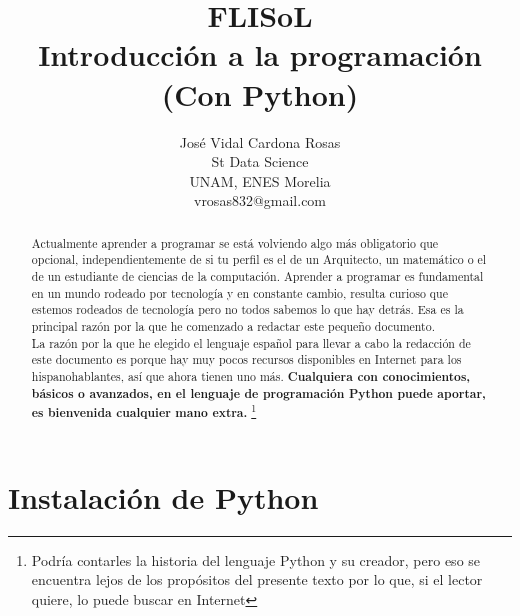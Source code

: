 \documentclass[a4paper,10pt]{article}
\title{FLISoL\\Introducción a la programación\\
(Con Python)}
\author{José Vidal Cardona Rosas\\
St Data Science\\
UNAM, ENES Morelia\\
vrosas832@gmail.com}
\begin{document}
\maketitle

\begin{abstract}
    Actualmente aprender a programar se está volviendo algo más obligatorio 
    que opcional, independientemente de si tu perfil es el de un Arquitecto, 
    un matemático o el de un estudiante de ciencias de la computación. Aprender 
    a programar es fundamental en un mundo rodeado por tecnología y en 
    constante cambio, resulta curioso que estemos rodeados de tecnología pero 
    no todos sabemos lo que hay detrás. Esa es la principal razón por la
    que he comenzado a redactar este pequeño documento.
    \\
    
    La razón por la que he elegido el lenguaje español para llevar a cabo 
    la redacción de este documento es porque hay muy pocos recursos disponibles
    en Internet para los hispanohablantes, así que ahora tienen uno más.
    \textbf{Cualquiera con conocimientos, básicos o avanzados, en el lenguaje 
    de programación Python puede aportar, es bienvenida cualquier mano extra.}
    \footnote{Podría contarles la historia del lenguaje Python
    y su creador, pero eso se encuentra lejos de los propósitos del presente 
    texto por lo que, si el lector quiere, lo puede buscar en Internet}
\end{abstract}

\section{Instalación de Python}
\end{document}
